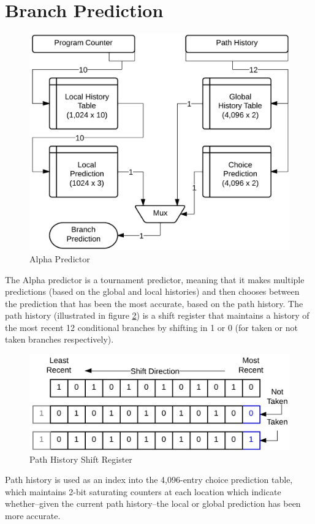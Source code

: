 \documentclass[twocolumn]{article}
\newcommand{\centerimage}[3]{
\begin{figure}[ht!]  
\begin{center} #1
\caption{#2}
\label{#3}
\end{center}
\end{figure}}
\begin{document}
\section{Branch Prediction}\centerimage{\includegraphics[width=\columnwidth]{img/alpha.png}}{Alpha Predictor}{alpha}
The Alpha predictor is a tournament predictor, meaning that it makes multiple predictions (based on the global and local histories) and then chooses between the prediction that has  been the most accurate, based on the path history.  The path history (illustrated in figure \ref{phistory}) is a shift register that maintains a history of the most recent 12 conditional branches by shifting in 1 or 0 (for taken or not taken branches respectively).\centerimage{\includegraphics[width=\columnwidth]{img/phistory.png}}{Path History Shift Register}{phistory}
Path history is used as an index into the 4,096-entry choice prediction table, which maintains 2-bit saturating counters at each location which indicate whether--given the current path history--the local or global prediction has been more accurate.\\\\  
\end{document}
